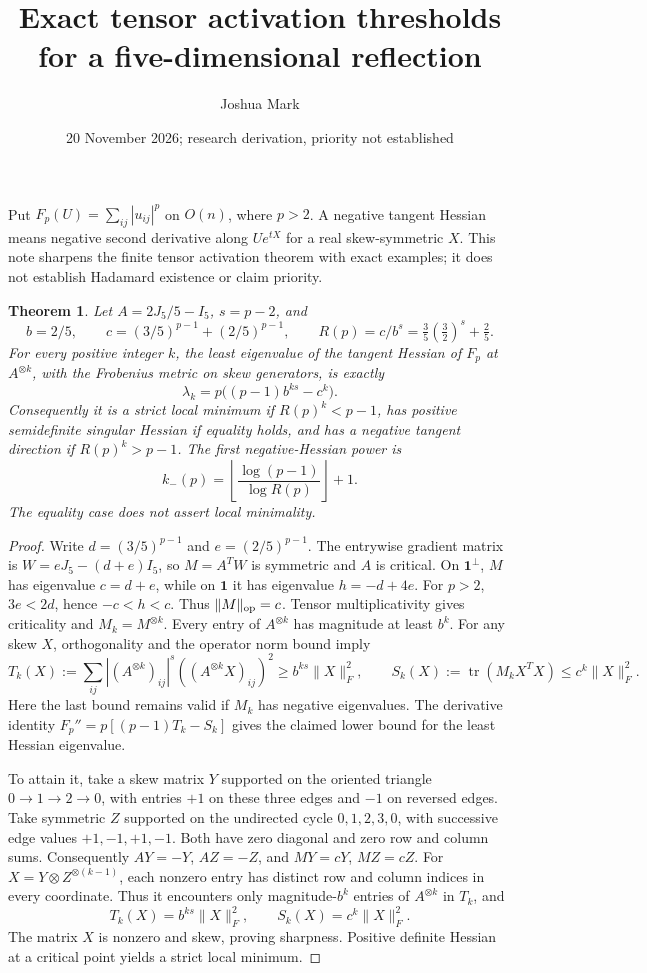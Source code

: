 \documentclass[11pt]{article}
\title{Exact tensor activation thresholds for a five-dimensional reflection}
\author{Joshua Mark}
\date{20 November 2026; research derivation, priority not established}
\newtheorem{theorem}{Theorem}
\newcommand{\tr}{\operatorname{tr}}
\begin{document}
\maketitle
Put $F_p(U)=\sum_{ij}|u_{ij}|^p$ on $O(n)$, where $p>2$.
A negative tangent Hessian means negative second derivative along
$Ue^{tX}$ for a real skew-symmetric $X$. This note sharpens the finite
tensor activation theorem with exact examples; it does not establish
Hadamard existence or claim priority.

\begin{theorem}\label{main}
Let $A=2J_5/5-I_5$, $s=p-2$, and
\[
 b=2/5,\qquad c=(3/5)^{p-1}+(2/5)^{p-1},\qquad
 R(p)=c/b^s=\tfrac35(\tfrac32)^s+\tfrac25.
\]
For every positive integer $k$, the least eigenvalue of the tangent
Hessian of $F_p$ at $A^{\otimes k}$, with the Frobenius metric on
skew generators, is exactly
\[
 \lambda_k=p\big((p-1)b^{ks}-c^k\big).
\]
Consequently it is a strict local minimum if $R(p)^k<p-1$, has positive
semidefinite singular Hessian if equality holds, and has a negative
tangent direction if $R(p)^k>p-1$. The first negative-Hessian power is
\[
 k_-(p)=\left\lfloor\frac{\log(p-1)}{\log R(p)}\right\rfloor+1.
\]
The equality case does not assert local minimality.
\end{theorem}
\begin{proof}
Write $d=(3/5)^{p-1}$ and $e=(2/5)^{p-1}$. The entrywise gradient
matrix is $W=eJ_5-(d+e)I_5$, so $M=A^TW$ is symmetric and $A$ is
critical. On $\mathbf1^\perp$, $M$ has eigenvalue $c=d+e$, while on
$\mathbf1$ it has eigenvalue $h=-d+4e$. For $p>2$,
$3e<2d$, hence $-c<h<c$. Thus $\|M\|_{\rm op}=c$.
Tensor multiplicativity gives criticality and $M_k=M^{\otimes k}$.
Every entry of $A^{\otimes k}$ has magnitude at least $b^k$.
For any skew $X$, orthogonality and the operator norm bound imply
\[
 T_k(X):=\sum_{ij}|(A^{\otimes k})_{ij}|^s
                 ((A^{\otimes k}X)_{ij})^2\ge b^{ks}\|X\|_F^2,
 \qquad
 S_k(X):=\tr(M_kX^TX)\le c^k\|X\|_F^2.
\]
Here the last bound remains valid if $M_k$ has negative eigenvalues.
The derivative identity $F_p''=p[(p-1)T_k-S_k]$ gives the claimed
lower bound for the least Hessian eigenvalue.

To attain it, take a skew matrix $Y$ supported on the oriented triangle
$0\to1\to2\to0$, with entries $+1$ on these three edges and $-1$
on reversed edges. Take symmetric $Z$ supported on the undirected
cycle $0,1,2,3,0$, with successive edge values $+1,-1,+1,-1$.
Both have zero diagonal and zero row and column sums. Consequently
$AY=-Y$, $AZ=-Z$, and $MY=cY$, $MZ=cZ$.
For $X=Y\otimes Z^{\otimes(k-1)}$, each nonzero entry has distinct
row and column indices in every coordinate. Thus it encounters only
magnitude-$b^k$ entries of $A^{\otimes k}$ in $T_k$, and
\[
 T_k(X)=b^{ks}\|X\|_F^2,\qquad S_k(X)=c^k\|X\|_F^2.
\]
The matrix $X$ is nonzero and skew, proving sharpness. Positive
definite Hessian at a critical point yields a strict local minimum.
\end{proof}
\end{document}

